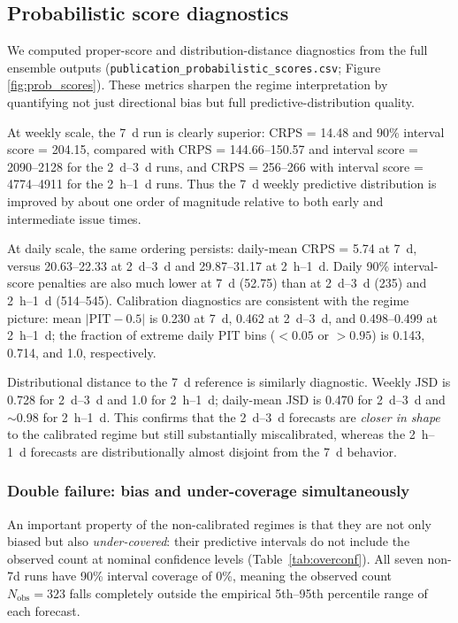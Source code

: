 \documentclass[12pt,letterpaper]{article}
\begin{document}
\subsection{Probabilistic score diagnostics}
\label{sec:prob_scores}

We computed proper-score and distribution-distance diagnostics from the full
ensemble outputs (\texttt{publication\_probabilistic\_scores.csv}; Figure
\ref{fig:prob_scores}). These metrics sharpen the regime interpretation by
quantifying not just directional bias but full predictive-distribution quality.

At weekly scale, the 7~d run is clearly superior:
CRPS = 14.48 and 90\% interval score = 204.15, compared with
CRPS = 144.66--150.57 and interval score = 2090--2128 for the 2~d--3~d runs,
and CRPS = 256--266 with interval score = 4774--4911 for the 2~h--1~d runs.
Thus the 7~d weekly predictive distribution is improved by about one order of
magnitude relative to both early and intermediate issue times.

At daily scale, the same ordering persists:
daily-mean CRPS = 5.74 at 7~d, versus 20.63--22.33 at 2~d--3~d and
29.87--31.17 at 2~h--1~d. Daily 90\% interval-score penalties are also much
lower at 7~d (52.75) than at 2~d--3~d (235) and 2~h--1~d (514--545).
Calibration diagnostics are consistent with the regime picture:
mean $|\mathrm{PIT}-0.5|$ is 0.230 at 7~d, 0.462 at 2~d--3~d, and
0.498--0.499 at 2~h--1~d; the fraction of extreme daily PIT bins
($<0.05$ or $>0.95$) is 0.143, 0.714, and 1.0, respectively.

Distributional distance to the 7~d reference is similarly diagnostic.
Weekly JSD is 0.728 for 2~d--3~d and 1.0 for 2~h--1~d; daily-mean JSD is
0.470 for 2~d--3~d and $\sim$0.98 for 2~h--1~d.
This confirms that the 2~d--3~d forecasts are \emph{closer in shape} to the
calibrated regime but still substantially miscalibrated, whereas the 2~h--1~d
forecasts are distributionally almost disjoint from the 7~d behavior.

\subsubsection*{Double failure: bias and under-coverage simultaneously}

An important property of the non-calibrated regimes is that they are not only
biased but also \emph{under-covered}: their predictive intervals do not include
the observed count at nominal confidence levels
(Table~\ref{tab:overconf}). All seven non-7d runs have 90\% interval coverage
of 0\%, meaning the observed count $N_{\mathrm{obs}}=323$ falls completely
outside the empirical 5th--95th percentile range of each forecast.
\end{document}
